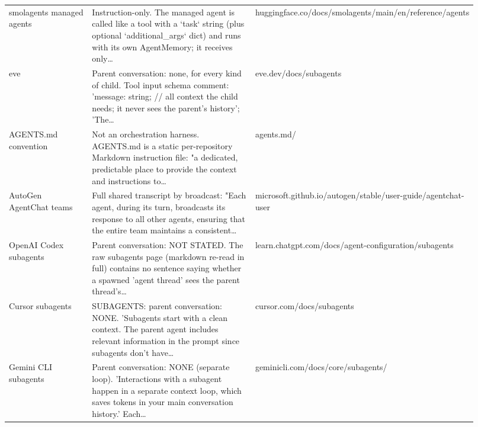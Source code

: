 \begin{longtable}{p{0.22\linewidth}p{0.5\linewidth}p{0.2\linewidth}}
smolagents managed agents & Instruction-\allowbreak{}only.\allowbreak{} The managed agent is called like a tool with a `task` string (plus optional `additional\_\allowbreak{}args` dict) and runs with its own AgentMemory; it receives only\ldots & huggingface.\allowbreak{}co/\allowbreak{}docs/\allowbreak{}smolagents/\allowbreak{}main/\allowbreak{}en/\allowbreak{}reference/\allowbreak{}agents \\
eve & Parent conversation: none, for every kind of child.\allowbreak{} Tool input schema comment: 'message: string; /\allowbreak{}/\allowbreak{} all context the child needs; it never sees the parent's history'; 'The\ldots & eve.\allowbreak{}dev/\allowbreak{}docs/\allowbreak{}subagents \\
AGENTS.\allowbreak{}md convention & Not an orchestratio\allowbreak{}n harness.\allowbreak{} AGENTS.\allowbreak{}md is a static per-\allowbreak{}repository Markdown instruction file: "a dedicated, predictable place to provide the context and instructions to\ldots & agents.\allowbreak{}md/\allowbreak{} \\
AutoGen AgentChat teams & Full shared transcript by broadcast: "Each agent, during its turn, broadcasts its response to all other agents, ensuring that the entire team maintains a consistent\ldots & microsoft.\allowbreak{}github.\allowbreak{}io/\allowbreak{}autogen/\allowbreak{}stable/\allowbreak{}user-\allowbreak{}guide/\allowbreak{}agentchat-\allowbreak{}user \\
OpenAI Codex subagents & Parent conversation: NOT STATED.\allowbreak{} The raw subagents page (markdown re-\allowbreak{}read in full) contains no sentence saying whether a spawned 'agent thread' sees the parent thread's\ldots & learn.\allowbreak{}chatgpt.\allowbreak{}com/\allowbreak{}docs/\allowbreak{}agent-\allowbreak{}configuratio\allowbreak{}n/\allowbreak{}subagents \\
Cursor subagents & SUBAGENTS: parent conversation: NONE.\allowbreak{} 'Subagents start with a clean context.\allowbreak{} The parent agent includes relevant information in the prompt since subagents don't have\ldots & cursor.\allowbreak{}com/\allowbreak{}docs/\allowbreak{}subagents \\
Gemini CLI subagents & Parent conversation: NONE (separate loop).\allowbreak{} 'Interactions with a subagent happen in a separate context loop, which saves tokens in your main conversation history.\allowbreak{}' Each\ldots & geminicli.\allowbreak{}com/\allowbreak{}docs/\allowbreak{}core/\allowbreak{}subagents/\allowbreak{} \\

\end{longtable}
